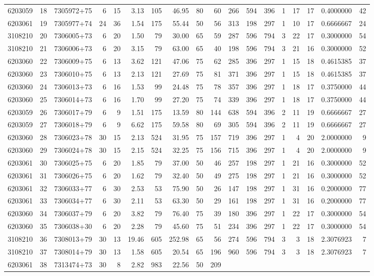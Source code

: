 \documentclass[
]{article}
\begin{document}
\begin{longtable}[]{@{}rrlrrrrrrrrrrrrrrr@{}}
6203059 & 18 & 7305972+75 & 6 & 15 & 3.13 & 105 & 46.95 & 80 & 60 & 266
& 594 & 396 & 1 & 17 & 17 & 0.4000000 & 42\tabularnewline
6203061 & 19 & 7305977+74 & 24 & 36 & 1.54 & 175 & 55.44 & 50 & 56 & 313
& 198 & 297 & 1 & 10 & 17 & 0.6666667 & 24\tabularnewline
3108210 & 20 & 7306005+73 & 6 & 20 & 1.50 & 79 & 30.00 & 65 & 59 & 287 &
596 & 794 & 3 & 22 & 17 & 0.3000000 & 54\tabularnewline
3108210 & 21 & 7306006+73 & 6 & 20 & 3.15 & 79 & 63.00 & 65 & 40 & 198 &
596 & 794 & 3 & 21 & 16 & 0.3000000 & 52\tabularnewline
6203060 & 22 & 7306009+75 & 6 & 13 & 3.62 & 121 & 47.06 & 75 & 62 & 285
& 396 & 297 & 1 & 15 & 18 & 0.4615385 & 37\tabularnewline
6203060 & 23 & 7306010+75 & 6 & 13 & 2.13 & 121 & 27.69 & 75 & 81 & 371
& 396 & 297 & 1 & 15 & 18 & 0.4615385 & 37\tabularnewline
6203060 & 24 & 7306013+73 & 6 & 16 & 1.53 & 99 & 24.48 & 75 & 78 & 357 &
396 & 297 & 1 & 18 & 17 & 0.3750000 & 44\tabularnewline
6203060 & 25 & 7306014+73 & 6 & 16 & 1.70 & 99 & 27.20 & 75 & 74 & 339 &
396 & 297 & 1 & 18 & 17 & 0.3750000 & 44\tabularnewline
6203059 & 26 & 7306017+79 & 6 & 9 & 1.51 & 175 & 13.59 & 80 & 144 & 638
& 594 & 396 & 2 & 11 & 19 & 0.6666667 & 27\tabularnewline
6203059 & 27 & 7306018+79 & 6 & 9 & 6.62 & 175 & 59.58 & 80 & 69 & 305 &
594 & 396 & 2 & 11 & 19 & 0.6666667 & 27\tabularnewline
6203060 & 28 & 7306023+78 & 30 & 15 & 2.13 & 524 & 31.95 & 75 & 157 &
719 & 396 & 297 & 1 & 4 & 20 & 2.0000000 & 9\tabularnewline
6203060 & 29 & 7306024+78 & 30 & 15 & 2.15 & 524 & 32.25 & 75 & 156 &
715 & 396 & 297 & 1 & 4 & 20 & 2.0000000 & 9\tabularnewline
6203061 & 30 & 7306025+75 & 6 & 20 & 1.85 & 79 & 37.00 & 50 & 46 & 257 &
198 & 297 & 1 & 21 & 16 & 0.3000000 & 52\tabularnewline
6203061 & 31 & 7306026+75 & 6 & 20 & 1.62 & 79 & 32.40 & 50 & 49 & 275 &
198 & 297 & 1 & 21 & 16 & 0.3000000 & 52\tabularnewline
6203061 & 32 & 7306033+77 & 6 & 30 & 2.53 & 53 & 75.90 & 50 & 26 & 147 &
198 & 297 & 1 & 31 & 16 & 0.2000000 & 77\tabularnewline
6203061 & 33 & 7306034+77 & 6 & 30 & 2.11 & 53 & 63.30 & 50 & 29 & 161 &
198 & 297 & 1 & 31 & 16 & 0.2000000 & 77\tabularnewline
6203060 & 34 & 7306037+79 & 6 & 20 & 3.82 & 79 & 76.40 & 75 & 39 & 180 &
396 & 297 & 1 & 22 & 17 & 0.3000000 & 54\tabularnewline
6203060 & 35 & 7306038+30 & 6 & 20 & 2.28 & 79 & 45.60 & 75 & 51 & 234 &
396 & 297 & 1 & 22 & 17 & 0.3000000 & 54\tabularnewline
3108210 & 36 & 7308013+79 & 30 & 13 & 19.46 & 605 & 252.98 & 65 & 56 &
274 & 596 & 794 & 3 & 3 & 18 & 2.3076923 & 7\tabularnewline
3108210 & 37 & 7308014+79 & 30 & 13 & 1.58 & 605 & 20.54 & 65 & 196 &
960 & 596 & 794 & 3 & 3 & 18 & 2.3076923 & 7\tabularnewline
6203061 & 38 & 7313474+73 & 30 & 8 & 2.82 & 983 & 22.56 & 50 & 209 &

\end{longtable}
\end{document}
